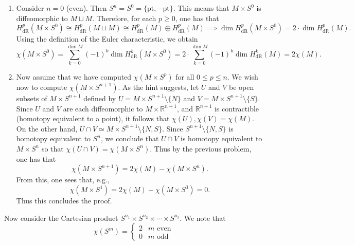 \documentclass{article}
\begin{document}
	\begin{enumerate}[itemsep =-2pt,label = (\arabic{*})]
		\item Consider $n = 0$ (even). Then $S^{n} = S^{0} = \{\text{pt}, -\text{pt}\}$. This means that $M \times S^{0}$ is diffeomorphic to $M \sqcup M$. Therefore, for each $p \geq 0$, one has that 
		\begin{equation*}
			H^{p}_{\text{dR}}(M \times S^{0}) \cong H^{p}_{\text{dR}}(M \sqcup M) \cong H^{p}_{\text{dR}}(M) \oplus H^{p}_{\text{dR}}(M) \implies \dim{H^{p}_{\text{dR}}(M \times S^{0})} = 2 \cdot \dim{H^{p}_{\text{dR}}(M)}. 
		\end{equation*}
		Using the definition of the Euler characteristic, we obtain 
		\begin{equation*}
			\chi(M \times S^{0}) = \sum_{k = 0}^{\dim{M}}(-1)^{k}\dim{H^{k}_{\text{dR}}(M \times S^{0})} = 2 \cdot \sum_{k = 0}^{\dim{M}}(-1)^{k}\dim{H^{k}_{\text{dR}}(M)} = 2\chi(M). 
		\end{equation*}
		\item Now assume that we have computed $\chi(M \times S^{p})$ for all $0 \leq p \leq n$. We wish now to compute $\chi(M \times S^{n + 1})$. As the hint suggests, let $U$ and $V$ be open subsets of $M \times S^{n + 1}$ defined by $U = M \times S^{n + 1} \setminus \{N\}$ and $V = M \times S^{n + 1} \setminus \{S\}$. Since $U$ and $V$ are each diffeomorphic to $M \times \mathbb{R}^{n + 1}$, and $\mathbb{R}^{n + 1}$ is contractible (homotopy equivalent to a point), it follows that $\chi(U), \chi(V) = \chi(M)$. On the other hand, $U \cap V \simeq M \times S^{n + 1}\setminus \{N, S\}$. Since $S^{n + 1} \setminus \{N, S\}$ is homotopy equivalent to $S^{n}$, we conclude that $U \cap V$ is homotopy equivalent to $M \times S^{n}$ so that $\chi(U \cap V) = \chi(M \times S^{n})$. Thus by the previous problem, one has that 
		\begin{equation*}
			\chi(M \times S^{n + 1}) = 2\chi(M) - \chi(M \times S^{n}). 
		\end{equation*}
		From this, one sees that, e.g., 
		\begin{equation*}
			\chi(M \times S^{1}) = 2\chi(M) - \chi(M \times S^{0}) = 0. 
		\end{equation*}
		Thus this concludes the proof. 
	\end{enumerate}
	Now consider the Cartesian product $S^{n_{1}} \times S^{n_{2}} \times \dotsm \times S^{n_{\ell}}$. We note that 
	\begin{equation*}
		\chi(S^{m}) = 
		\begin{cases}
			2 &\text{$m$ even} \\
			0 & \text{$m$ odd}
		\end{cases}
	\end{equation*}
\end{document}
